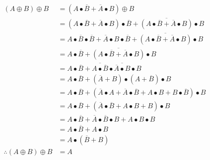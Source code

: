   \begin{align*}
    (A \oplus B) \oplus B	& = (A \bullet \overline{B} + \overline{A} \bullet B) \oplus B \\
                & = (A \bullet \overline{B} + \overline{A} \bullet B) \bullet \overline{B} + \overline{(A \bullet \overline{B} + \overline{A} \bullet B)}\bullet B \\
                & = A \bullet \overline{B} \bullet \overline{B} + \overline{A} \bullet B \bullet \overline{B} + \overline{(A \bullet \overline{B} + \overline{A} \bullet B)}\bullet B \\
                & = A \bullet \overline{B} + \overline{(A \bullet \overline{B} + \overline{A} \bullet B)}\bullet B \\
                & = A \bullet \overline{B} + \overline{A \bullet \overline{B}} \bullet \overline{\overline{A} \bullet B}\bullet B \\
                & = A \bullet \overline{B} + (\overline{A} + B)\bullet(A + \overline{B})\bullet B \\
                & = A \bullet \overline{B} + (\overline{A}\bullet A + \overline{A}\bullet\overline{B} + A\bullet B + B \bullet \overline{B})\bullet B\\
                & = A \bullet \overline{B} + (\overline{A}\bullet\overline{B} + A\bullet B + B)\bullet B \\
                & = A \bullet \overline{B} + \overline{A} \bullet \overline{B} \bullet B + A \bullet B \bullet B \\
                & = A \bullet \overline{B} + A \bullet B \\
                & = A \bullet (\overline{B} + B)\\
    \therefore (A \oplus B) \oplus B	& = A
  \end{align*}
